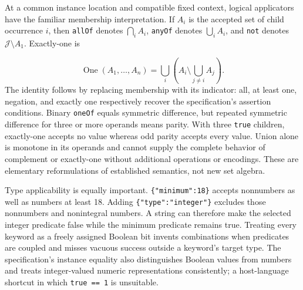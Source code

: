 \documentclass[sigconf,nonacm]{acmart}
\begin{document}
At a common instance location and compatible fixed context, logical applicators have the familiar membership interpretation. If $A_i$ is the accepted set of child occurrence $i$, then \texttt{a\allowbreak{}l\allowbreak{}l\allowbreak{}O\allowbreak{}f} denotes $\bigcap_i A_i$, \texttt{a\allowbreak{}n\allowbreak{}y\allowbreak{}O\allowbreak{}f} denotes $\bigcup_i A_i$, and \texttt{n\allowbreak{}o\allowbreak{}t} denotes $\mathcal{J}\setminus A_1$. Exactly-one is

\[
\operatorname{One}(A_1,\ldots,A_n)
=\bigcup_i\left(A_i\setminus\bigcup_{j\ne i}A_j\right).
\]
The identity follows by replacing membership with its indicator: all, at least one, negation, and exactly one respectively recover the specification's assertion conditions. Binary \texttt{o\allowbreak{}n\allowbreak{}e\allowbreak{}O\allowbreak{}f} equals symmetric difference, but repeated symmetric difference for three or more operands means parity. With three \texttt{t\allowbreak{}r\allowbreak{}u\allowbreak{}e} children, exactly-one accepts no value whereas odd parity accepts every value. Union alone is monotone in its operands and cannot supply the complete behavior of complement or exactly-one without additional operations or encodings. These are elementary reformulations of established semantics, not new set algebra. \cite{ref5,ref6,ref9}

Type applicability is equally important. \texttt{\{\allowbreak{}"\allowbreak{}m\allowbreak{}i\allowbreak{}n\allowbreak{}i\allowbreak{}m\allowbreak{}u\allowbreak{}m\allowbreak{}"\allowbreak{}:\allowbreak{}1\allowbreak{}8\allowbreak{}\}} accepts nonnumbers as well as numbers at least 18. Adding \texttt{\{\allowbreak{}"\allowbreak{}t\allowbreak{}y\allowbreak{}p\allowbreak{}e\allowbreak{}"\allowbreak{}:\allowbreak{}"\allowbreak{}i\allowbreak{}n\allowbreak{}t\allowbreak{}e\allowbreak{}g\allowbreak{}e\allowbreak{}r\allowbreak{}"\allowbreak{}\}} excludes those nonnumbers and nonintegral numbers. A string can therefore make the selected integer predicate false while the minimum predicate remains true. Treating every keyword as a freely assigned Boolean bit invents combinations when predicates are coupled and misses vacuous success outside a keyword's target type. The specification's instance equality also distinguishes Boolean values from numbers and treats integer-valued numeric representations consistently; a host-language shortcut in which \texttt{t\allowbreak{}r\allowbreak{}u\allowbreak{}e\allowbreak{} \allowbreak{}=\allowbreak{}=\allowbreak{} \allowbreak{}1} is unsuitable. \cite{ref10}
\end{document}
